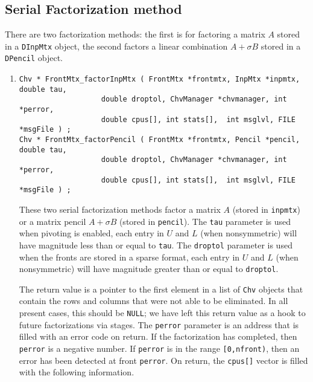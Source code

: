 \subsection{Serial Factorization method}
\label{subsection:FrontMtx:proto:factor}
There are two factorization methods: the first is for factoring
a matrix $A$ stored in a {\tt DInpMtx} object, the second factors
a linear combination $A + \sigma B$ stored in a {\tt DPencil} object.
\par
\begin{enumerate}
\item
\begin{verbatim}
Chv * FrontMtx_factorInpMtx ( FrontMtx *frontmtx, InpMtx *inpmtx, double tau, 
                   double droptol, ChvManager *chvmanager, int *perror, 
                   double cpus[], int stats[],  int msglvl, FILE *msgFile ) ;
Chv * FrontMtx_factorPencil ( FrontMtx *frontmtx, Pencil *pencil, double tau, 
                   double droptol, ChvManager *chvmanager, int *perror, 
                   double cpus[], int stats[],  int msglvl, FILE *msgFile ) ;
\end{verbatim}
These two serial factorization methods factor a matrix $A$ 
(stored in {\tt inpmtx}) or
a matrix pencil $A + \sigma B$ (stored in {\tt pencil}).
The {\tt tau} parameter is used when pivoting is enabled, each
entry in $U$ and $L$ (when nonsymmetric) will have magnitude less
than or equal to {\tt tau}.
The {\tt droptol} parameter is used when the fronts are stored in
a sparse format, each entry in $U$ and $L$ (when nonsymmetric) 
will have magnitude greater than or equal to {\tt droptol}.
\par
The return value is a pointer to the first element in a list of
{\tt Chv} objects that contain the rows and columns that were
not able to be eliminated.
In all present cases, this should be {\tt NULL}; we have left this
return value as a hook to future factorizations via stages.
The {\tt perror} parameter is an address that is filled with an
error code on return.
If the factorization has completed, then {\tt *perror} is a
negative number.
If {\tt *perror} is in the range {\tt [0,nfront)}, then an error
has been detected at front {\tt *perror}.
On return, the {\tt cpus[]} vector is filled with the following
information.
\begin{itemize}

\end{itemize}
\end{enumerate}
